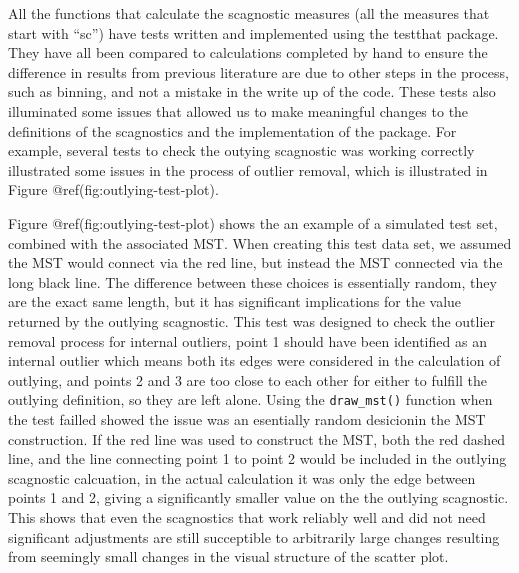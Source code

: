 All the functions that calculate the scagnostic measures (all the
measures that start with ``sc'') have tests written and implemented
using the testthat package. They have all been compared to calculations
completed by hand to ensure the difference in results from previous
literature are due to other steps in the process, such as binning, and
not a mistake in the write up of the code. These tests also illuminated
some issues that allowed us to make meaningful changes to the
definitions of the scagnostics and the implementation of the package.
For example, several tests to check the outying scagnostic was working
correctly illustrated some issues in the process of outlier removal,
which is illustrated in Figure @ref(fig:outlying-test-plot).

Figure @ref(fig:outlying-test-plot) shows the an example of a simulated
test set, combined with the associated MST. When creating this test data
set, we assumed the MST would connect via the red line, but instead the
MST connected via the long black line. The difference between these
choices is essentially random, they are the exact same length, but it
has significant implications for the value returned by the outlying
scagnostic. This test was designed to check the outlier removal process
for internal outliers, point 1 should have been identified as an
internal outlier which means both its edges were considered in the
calculation of outlying, and points 2 and 3 are too close to each other
for either to fulfill the outlying definition, so they are left alone.
Using the \texttt{draw\_mst()} function when the test failled showed the
issue was an esentially random desicionin the MST construction. If the
red line was used to construct the MST, both the red dashed line, and
the line connecting point 1 to point 2 would be included in the outlying
scagnostic calcuation, in the actual calculation it was only the edge
between points 1 and 2, giving a significantly smaller value on the the
outlying scagnostic. This shows that even the scagnostics that work
reliably well and did not need significant adjustments are still
succeptible to arbitrarily large changes resulting from seemingly small
changes in the visual structure of the scatter plot.

